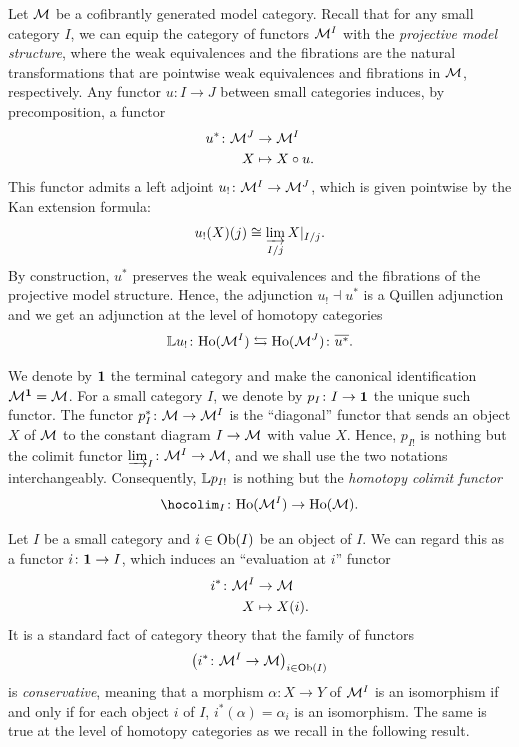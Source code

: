 \begin{paragr}\label{paragr:htpykan} Let $\mathcal{M}$ be a cofibrantly generated model
category. Recall that for any small category $I$, we can equip the
category of functors ${\mathcal{M}}^{I}$ with the \emph{projective model
structure}, where the weak equivalences and the fibrations are the
natural transformations that are pointwise weak equivalences and
fibrations in $\mathcal{M}$, respectively. Any functor $u \colon I \to J$
between small categories induces, by precomposition, a functor
  \begin{align*} u^* \colon {\mathcal{M}}^{J} &\to {\mathcal{M}}^{I}\\ X &\mapsto
X\circ u.
  \end{align*} This functor admits a left adjoint $u_!
\colon{\mathcal{M}}^{I} \to {\mathcal{M}}^{J} $, which is given pointwise by the Kan
extension formula:
  \[ u_!(X)(j)\cong\varinjlim_{I/j}X\vert_{I/j}.
  \] By construction, $u^*$ preserves the weak equivalences and the
fibrations of the projective model structure. Hence, the adjunction
$u_! \dashv u^*$ is a Quillen adjunction and we get an adjunction at
the level of homotopy categories
  \[ \mathbb{L} u_! \colon \mathrm{Ho}({\mathcal{M}}^{I}) \leftrightarrows
\mathrm{Ho}({\mathcal{M}}^{J}) \colon \overline{u^*}.
  \]
\end{paragr}
\begin{paragr}\label{paragr:hocolim} We denote by $\mathbf{1}$ the terminal category and make the
canonical identification ${\mathcal{M}}^{\mathbf{1}}=\mathcal{M}$. For a small category
$I$, we denote by $p_I \colon I \to \mathbf{1}$ the unique such
functor. The functor $p_I^* \colon \mathcal{M} \to {\mathcal{M}}^{I}$ is the
``diagonal'' functor that sends an object $X$ of $\mathcal{M}$ to the
constant diagram $I \to \mathcal{M}$ with value $X$. Hence, $p_{I!}$ is nothing
but the colimit functor $\varinjlim_I \colon {\mathcal{M}}^{I} \to \mathcal{M}$, and we
shall use the two notations interchangeably. Consequently, $\mathbb{L}
p_{I!}$ is nothing but the \emph{homotopy colimit functor}
\[
  \hocolim_I \colon \Loc{\fun{I}{\M}} \to \Loc{\M}.
  \]
\end{paragr}
\begin{paragr} Let $I$ be a small category and $i \in \mathrm{Ob}(I)$ be an
object of $I$. We can regard this as a functor $i \colon \mathbf{1} \to I$,
which induces an ``evaluation at $i$'' functor
  \begin{align*} i^* \colon {\mathcal{M}}^{I} &\to \mathcal{M}\\ X &\mapsto X(i).
  \end{align*} It is a standard fact of category theory that the
family of functors
  \[\left(i^*\colon {\mathcal{M}}^{I} \to \mathcal{M}\right)_{i\in \mathrm{Ob}(I)}\] is
\emph{conservative}, meaning that a morphism $\alpha \colon X \to Y$
of ${\mathcal{M}}^{I}$ is an isomorphism if and only if for each object $i$
of $I$, $i^*(\alpha)=\alpha_i$ is an isomorphism. The same is true at
the level of homotopy categories as we recall in the following result.
\end{paragr}
